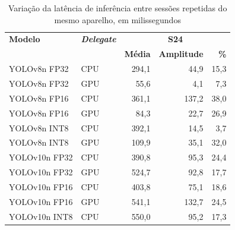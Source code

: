 \begin{table}[H]
\centering
\small
\caption{Variação da latência de inferência entre sessões repetidas do
mesmo aparelho, em milissegundos}
\label{tab:sessoes}
\begin{tabular}{llrrr}
\toprule
\textbf{Modelo} & \textbf{\textit{Delegate}} & \multicolumn{3}{c}{\textbf{S24}} \\
 & & \textbf{Média} & \textbf{Amplitude} & \textbf{\%} \\
\midrule
YOLOv8n FP32 & \ac{CPU} & 294,1 & 44,9 & 15,3 \\
YOLOv8n FP32 & \ac{GPU} & 55,6 & 4,1 & 7,3 \\
YOLOv8n FP16 & \ac{CPU} & 361,1 & 137,2 & 38,0 \\
YOLOv8n FP16 & \ac{GPU} & 84,3 & 22,7 & 26,9 \\
YOLOv8n INT8 & \ac{CPU} & 392,1 & 14,5 & 3,7 \\
YOLOv8n INT8 & \ac{GPU} & 109,9 & 35,1 & 32,0 \\
\midrule
YOLOv10n FP32 & \ac{CPU} & 390,8 & 95,3 & 24,4 \\
YOLOv10n FP32 & \ac{GPU} & 524,7 & 92,8 & 17,7 \\
YOLOv10n FP16 & \ac{CPU} & 403,8 & 75,1 & 18,6 \\
YOLOv10n FP16 & \ac{GPU} & 541,1 & 132,7 & 24,5 \\
YOLOv10n INT8 & \ac{CPU} & 550,0 & 95,2 & 17,3 \\
\bottomrule
\end{tabular}
\end{table}

